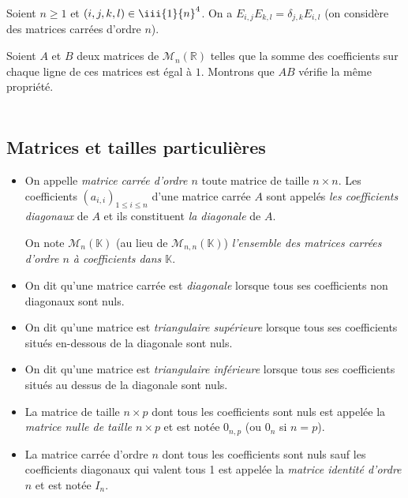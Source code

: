 \documentclass[french,11pt,twoside]{VcCours}
\begin{document}
\medskip


\begin{Proposition}{}  Soient $n \geq 1$ et $(i,j,k,l) \in \iii{1}{n}^4$. On a $E_{i,j} E_{k,l} = \delta_{j,k} E_{i,l}$ (on considère des matrices carrées d'ordre $n$).
\end{Proposition}

\begin{Exemple} Soient $A$ et $B$ deux matrices de $\mathcal{M}_n(\mathbb{R})$ telles que la somme des coefficients sur chaque ligne de ces matrices est égal à $1$. Montrons que $AB$ vérifie la même propriété.



\end{Exemple}

\newpage

$\phantom{test}$

\vspace{8cm}
\subsection{Matrices et tailles particulières}

\begin{Definition}{}
\begin{itemize}
\item On appelle \emph{matrice carrée d'ordre $n$} toute matrice de taille $n \times n$. Les coefficients $(a_{i,i})_{1 \leq i \leq n}$ d'une matrice carrée $A$ sont appelés \emph{les coefficients diagonaux} de $A$ et ils constituent \emph{la diagonale} de $A$.

On note $\mathcal{M}_n(\mathbb{K})$ (au lieu de $\mathcal{M}_{n,n}( \mathbb{K})$) \emph{l'ensemble des matrices carrées d'ordre $n$ à coefficients dans $\mathbb{K}$}.
\item On dit qu'une matrice carrée est \emph{diagonale} lorsque tous ses coefficients non diagonaux sont nuls.
\item On dit qu'une matrice est \emph{triangulaire supérieure} lorsque tous ses coefficients situés en-dessous de la diagonale sont nuls.
\item On dit qu'une matrice est \emph{triangulaire inférieure} lorsque tous ses coefficients situés au dessus de la diagonale sont nuls.
\end{itemize}
\end{Definition}



\begin{Definition}{}
\begin{itemize}
\item La matrice de taille $n \times p$ dont tous les coefficients sont nuls est appelée la \emph{matrice nulle de taille $n \times p$} et est notée $0_{n,p}$ (ou $0_{n}$ si $n=p$).
\item La matrice carrée d'ordre $n$ dont tous les coefficients sont nuls sauf les coefficients diagonaux qui valent tous 1 est appelée la \emph{matrice identité d'ordre $n$} et est notée $I_n$.
\end{itemize}
\end{Definition}
\end{document}
